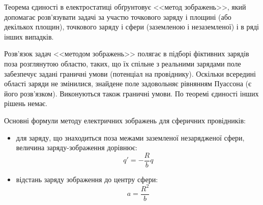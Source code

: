 \begin{Theory}\small

Теорема єдиності в електростатиці обґрунтовує <<метод зображень>>, який допомагає розв'язувати задачі за участю точкового заряду і площині (або декількох площин), точкового заряду і сфери (заземленою і незаземленої) і в ряді інших випадків.

Розв'язок задач <<методом зображень>> полягає в підборі фіктивних зарядів поза розглянутою областю, таких, що їх спільне з реальними зарядами поле забезпечує задані граничні умови (потенціал на провіднику). Оскільки всередині області заряди не змінилися, знайдене поле задовольняє рівнянням Пуассона (є його розв'язком). Виконуються також граничні умови. По теоремі єдиності інших рішень немає.


Основні формули методу електричних зображень для сферичних провідників:

\begin{itemize}
	\item для заряду, що знаходиться поза межами заземленої незарядженої сфери, величина заряду-зображення дорівнює:
	\begin{equation}\label{mirror_q_outside}
		q' = -\frac{R}{b}q
	\end{equation}

	\item відстань заряду зображення до центру сфери:
	\begin{equation}\label{mirror_q_outside}
	a = \frac{R^2}{b}
	\end{equation}
\end{itemize}


\end{Theory}
